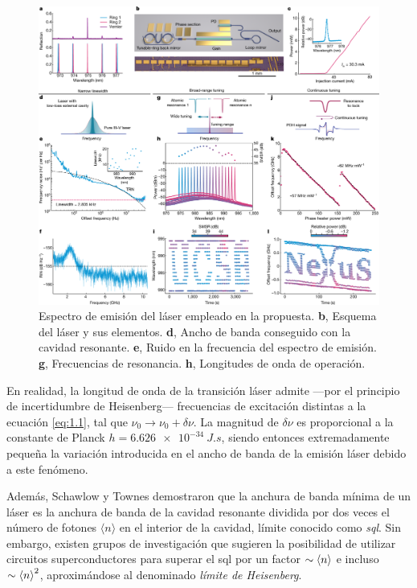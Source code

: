 \begin{figure}[ht!]
  \centering
  \includegraphics[width=\textwidth]{Figuras/ch1_amplif.png}
  \caption{Espectro de emisión del láser empleado en la propuesta\autocite{tranExtendingSpectrumFully2022}. \textbf{b}, Esquema del láser y sus elementos. \textbf{d}, Ancho de banda conseguido con la cavidad resonante. \textbf{e}, Ruido en la frecuencia del espectro de emisión. \textbf{g}, Frecuencias de resonancia. \textbf{h}, Longitudes de onda de operación.}
  \label{fig:ch1_amplif}
\end{figure}

En realidad, la longitud de onda de la transición láser admite ---por el principio de incertidumbre de Heisenberg--- frecuencias de excitación distintas a la ecuación \eqref{eq:1.1}, tal que $\nu_0\rightarrow\nu_0 + \delta\nu$. La magnitud de $\delta\nu$ es proporcional a la constante de Planck $h = \qty{6,626e-34}{J.s}$, siendo entonces extremadamente pequeña la variación introducida en el ancho de banda de la emisión láser debido a este fenómeno. 

Además, Schawlow y Townes demostraron que la anchura de banda mínima de un láser es la anchura de banda de la cavidad resonante dividida por dos veces el número de fotones $\langle n\rangle$ en el interior de la cavidad, límite conocido como \emph{\acrfull{sql}}. Sin embargo, existen grupos de investigación\autocite{liuProposalContinuousWave2021} que sugieren la posibilidad de utilizar circuitos superconductores para superar el \acrshort{sql} por un factor $\sim \left\langle n\right\rangle$ e incluso $\sim \left\langle n\right\rangle^{2}$, aproximándose al denominado \emph{límite de Heisenberg}.

